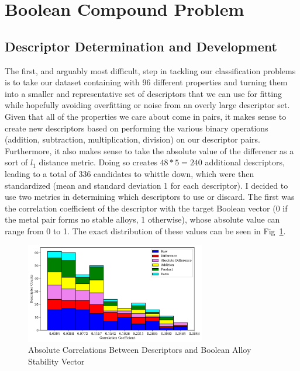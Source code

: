 \documentclass[11pt]{article}
\begin{document}
\section{Boolean Compound Problem}
\subsection{Descriptor Determination and Development}
\noindent The first, and arguably most difficult, step in tackling our classification problems is to take our dataset containing with 96 different properties and turning them into a smaller and representative set of descriptors that we can use for fitting while hopefully avoiding overfitting or noise from an overly large descriptor set. Given that all of the properties we care about come in pairs, it makes sense to create new descriptors based on performing the various binary operations (addition, subtraction, multiplication, division) on our descriptor pairs. Furthermore, it also makes sense to take the absolute value of the differencr as a sort of $l_1$ distance metric. Doing so creates $48*5 = 240$ additional descriptors, leading to a total of 336 candidates to whittle down, which were then standardized (mean and standard deviation 1 for each descriptor). I decided to use two metrics in determining which descriptors to use or discard. The first was the correlation coefficient of the descriptor with the target Boolean vector (0 if the metal pair forms no stable alloys, 1 otherwise), whose absolute value can range from 0 to 1. The exact distribution of these values can be seen in Fig~\ref{bool_corr_hist}. 

\begin{figure}[H]
\centering
\includegraphics[width=0.7\textwidth]{descriptor_correlations_hist.png}
\caption{Absolute Correlations Between Descriptors and Boolean Alloy Stability Vector}
\label{bool_corr_hist}
\end{figure}
\end{document}
